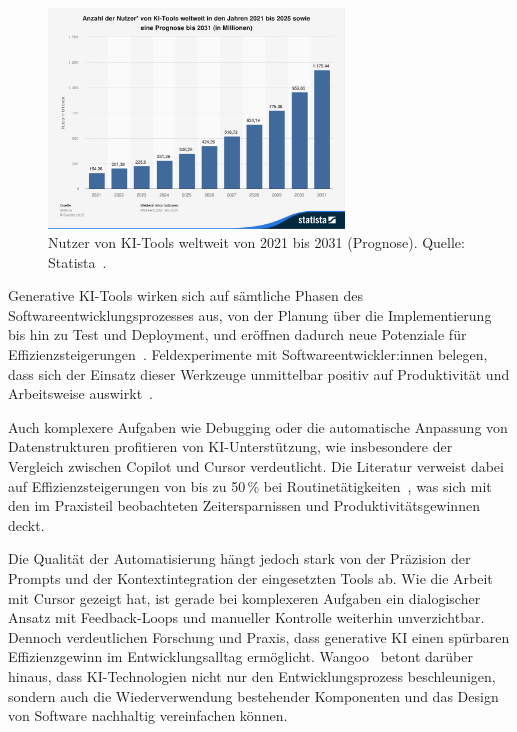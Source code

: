 \begin{figure}[htbp]
    \centering
    \vspace{1em}
    \includegraphics[width=0.7\textwidth]{images/abbildungen/statistic_id1469771_nutzer-von-ki-tools-weltweit-von-2021-bis-2031.png}
    \caption{Nutzer von KI-Tools weltweit von 2021 bis 2031 (Prognose). Quelle: Statista~\cite{statista_ki_nutzer_2031}.}
    \label{fig:ki-nutzerwachstum}
\end{figure}

Generative KI-Tools wirken sich auf sämtliche Phasen des
Softwareentwicklungsprozesses aus, von der Planung über die Implementierung bis
hin zu Test und Deployment, und eröffnen dadurch neue Potenziale für
Effizienzsteigerungen~\cite{minikiewicz_impact_nodate}. Feldexperimente mit
Softwareentwickler:innen belegen, dass sich der Einsatz dieser Werkzeuge
unmittelbar positiv auf Produktivität und Arbeitsweise
auswirkt~\cite{cui_effects_2024}.

Auch komplexere Aufgaben wie Debugging oder die automatische Anpassung von
Datenstrukturen profitieren von KI-Unterstützung, wie insbesondere der
Vergleich zwischen Copilot und Cursor verdeutlicht. Die Literatur verweist
dabei auf Effizienzsteigerungen von bis zu 50\,\% bei
Routinetätigkeiten~\cite{s_future_2024}, was sich mit den im Praxisteil
beobachteten Zeitersparnissen und Produktivitätsgewinnen deckt.

Die Qualität der Automatisierung hängt jedoch stark von der Präzision der
Prompts und der Kontextintegration der eingesetzten Tools ab. Wie die Arbeit
mit Cursor gezeigt hat, ist gerade bei komplexeren Aufgaben ein dialogischer
Ansatz mit Feedback-Loops und manueller Kontrolle weiterhin unverzichtbar.
Dennoch verdeutlichen Forschung und Praxis, dass generative KI einen spürbaren
Effizienzgewinn im Entwicklungsalltag ermöglicht.
Wangoo~\cite{wangoo_artificial_2018} betont darüber hinaus, dass
KI-Technologien nicht nur den Entwicklungsprozess beschleunigen, sondern auch
die Wiederverwendung bestehender Komponenten und das Design von Software
nachhaltig vereinfachen können.